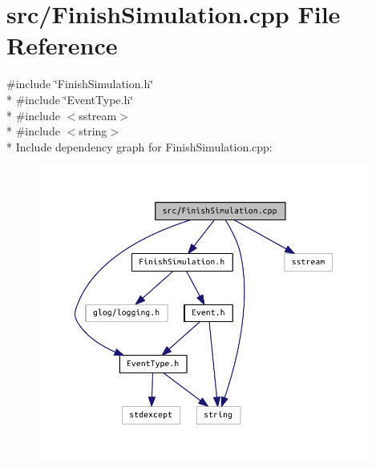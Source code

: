 \section{src/\+Finish\+Simulation.cpp File Reference}
\label{_finish_simulation_8cpp}
{\ttfamily \#include \char`\"{}Finish\+Simulation.\+h\char`\"{}}\\*
{\ttfamily \#include \char`\"{}Event\+Type.\+h\char`\"{}}\\*
{\ttfamily \#include $<$sstream$>$}\\*
{\ttfamily \#include $<$string$>$}\\*
Include dependency graph for Finish\+Simulation.\+cpp\+:
\nopagebreak
\begin{figure}[H]
\begin{center}
\leavevmode
\includegraphics[width=310pt]{_finish_simulation_8cpp__incl}
\end{center}
\end{figure}
